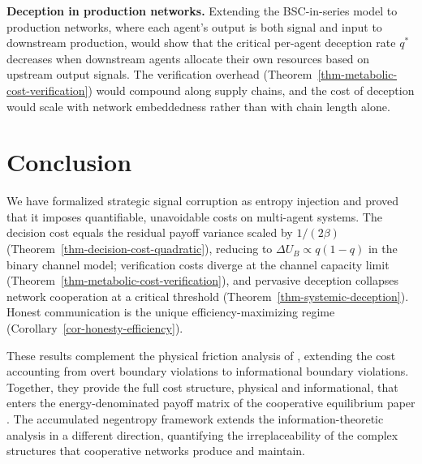 \documentclass[11pt]{article}
\theoremstyle{plain}
\theoremstyle{definition}
\theoremstyle{remark}
\let\origsection\section
\renewcommand{\section}{\needspace{12\baselineskip}\origsection}
\begin{document}
\textbf{Deception in production networks.} Extending the BSC-in-series
model to production networks, where each agent's output is both signal
and input to downstream production, would show that the critical
per-agent deception rate \(q^*\) decreases when downstream agents
allocate their own resources based on upstream output signals. The
verification overhead (Theorem~\ref{thm-metabolic-cost-verification})
would compound along supply chains, and the cost of deception would
scale with network embeddedness rather than with chain length alone.

\section{Conclusion}\label{conclusion}

We have formalized strategic signal corruption as entropy injection and
proved that it imposes quantifiable, unavoidable costs on multi-agent
systems. The decision cost equals the residual payoff variance scaled by
\(1/(2\beta)\) (Theorem~\ref{thm-decision-cost-quadratic}), reducing to
\(\Delta U_B \propto q(1-q)\) in the binary channel model; verification
costs diverge at the channel capacity limit
(Theorem~\ref{thm-metabolic-cost-verification}), and pervasive deception
collapses network cooperation at a critical threshold
(Theorem~\ref{thm-systemic-deception}). Honest communication is the
unique efficiency-maximizing regime
(Corollary~\ref{cor-honesty-efficiency}).

These results complement the physical friction analysis of
\citep{TC-IV}, extending the cost accounting from overt boundary
violations to informational boundary violations. Together, they provide
the full cost structure, physical and informational, that enters the
energy-denominated payoff matrix of the cooperative equilibrium paper
\citep{TC-V}. The accumulated negentropy framework \citep{TC-III}
extends the information-theoretic analysis in a different direction,
quantifying the irreplaceability of the complex structures that
cooperative networks produce and maintain.
\end{document}
